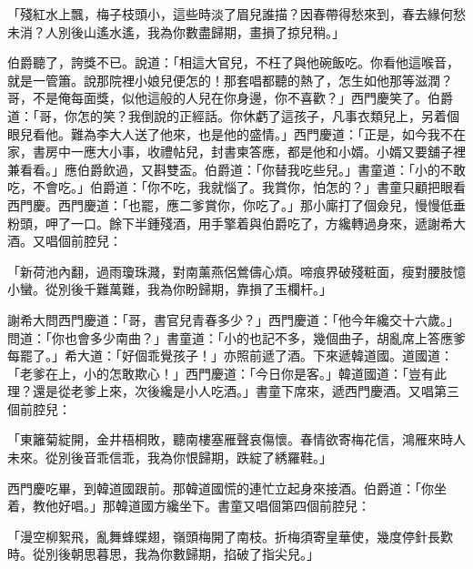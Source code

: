 \begin{showcontents}{}
「殘紅水上飄，梅子枝頭小，這些時淡了眉兒誰描？因春帶得愁來到，春去緣何愁未消？人別後山遙水遙，我為你數盡歸期，畫損了掠兒稍。」

伯爵聽了，誇獎不已。說道：「相這大官兒，不枉了與他碗飯吃。你看他這喉音，就是一管簫。說那院裡小娘兒便怎的！那套唱都聽的熱了，怎生如他那等滋潤？哥，不是俺每面獎，似他這般的人兒在你身邊，你不喜歡？」西門慶笑了。伯爵道：「哥，你怎的笑？我倒說的正經話。你休虧了這孩子，凡事衣類兒上，另着個眼兒看他。難為李大人送了他來，也是他的盛情。」西門慶道：「正是，如今我不在家，書房中一應大小事，收禮帖兒，封書柬答應，都是他和小婿。小婿又要舖子裡兼看看。」應伯爵飲過，又斟雙盃。伯爵道：「你替我吃些兒。」書童道：「小的不敢吃，不會吃。」伯爵道：「你不吃，我就惱了。我賞你，怕怎的？」書童只顧把眼看西門慶。西門慶道：「也罷，應二爹賞你，你吃了。」那小廝打了個僉兒，慢慢低垂粉頭，呷了一口。餘下半鍾殘酒，用手擎着與伯爵吃了，方纔轉過身來，遞謝希大酒。又唱個前腔兒：

「新荷池內翻，過雨瓊珠濺，對南薰燕侶鶯儔心煩。啼痕界破殘粧面，瘦對腰肢憶小蠻。從別後千難萬難，我為你盼歸期，靠損了玉欄杆。」

謝希大問西門慶道：「哥，書官兒青春多少？」西門慶道：「他今年纔交十六歲。」問道：「你也會多少南曲？」書童道：「小的也記不多，幾個曲子，胡亂席上答應爹每罷了。」希大道：「好個乖覺孩子！」亦照前遞了酒。下來遞韓道國。道國道：「老爹在上，小的怎敢欺心！」西門慶道：「今日你是客。」韓道國道：「豈有此理？還是從老爹上來，次後纔是小人吃酒。」書童下席來，遞西門慶酒。又唱第三個前腔兒：

「東籬菊綻開，金井梧桐敗，聽南樓塞雁聲哀傷懷。春情欲寄梅花信，鴻雁來時人未來。從別後音乖信乖，我為你恨歸期，跌綻了綉羅鞋。」

西門慶吃畢，到韓道國跟前。那韓道國慌的連忙立起身來接酒。伯爵道：「你坐着，教他好唱。」那韓道國方纔坐下。書童又唱個第四個前腔兒：

「漫空柳絮飛，亂舞蜂蝶翅，嶺頭梅開了南枝。折梅須寄皇華使，幾度停針長歎時。從別後朝思暮思，我為你數歸期，掐破了指尖兒。」


\end{showcontents}
